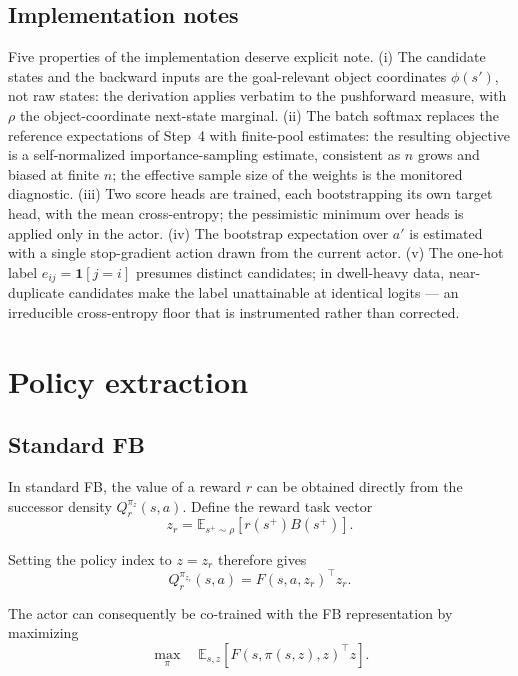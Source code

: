 \documentclass[11pt]{article}
\begin{document}
{\subsection*{Implementation notes}

Five properties of the implementation deserve explicit note.
(i) The candidate states and the backward inputs are the goal-relevant object coordinates $\phi(s')$, not raw states: the derivation applies verbatim to the pushforward measure, with $\rho$ the object-coordinate next-state marginal.
(ii) The batch softmax replaces the reference expectations of Step~4 with finite-pool estimates: the resulting objective is a self-normalized importance-sampling estimate, consistent as $n$ grows and biased at finite $n$; the effective sample size of the weights is the monitored diagnostic.
(iii) Two score heads are trained, each bootstrapping its own target head, with the mean cross-entropy; the pessimistic minimum over heads is applied only in the actor.
(iv) The bootstrap expectation over $a'$ is estimated with a single stop-gradient action drawn from the current actor.
(v) The one-hot label $e_{ij}=\mathbf 1[j=i]$ presumes distinct candidates; in dwell-heavy data, near-duplicate candidates make the label unattainable at identical logits --- an irreducible cross-entropy floor that is instrumented rather than corrected.
}

\section{Policy extraction}
\label{sec:policy-extraction}

\subsection{Standard FB}

In standard FB, the value of a reward $r$ can be obtained directly from the successor density $Q_r^{\pi_z}(s,a)$.
Define the reward task vector
\begin{equation}
    z_r = \mathbb E_{s^+\sim\rho} \left[ r(s^+)B(s^+) \right].
\label{eq:fb-zr}
\end{equation}

Setting the policy index to $z=z_r$ therefore gives
\begin{equation}
    Q_r^{\pi_{z_r}}(s,a) = F(s,a,z_r)^\top z_r.
\end{equation}

The actor can consequently be co-trained with the FB representation by maximizing
\begin{equation}
    \max_\pi \quad \mathbb E_{s,z}\left[ F(s,\pi(s,z),z)^\top z \right].
\end{equation}
\end{document}
